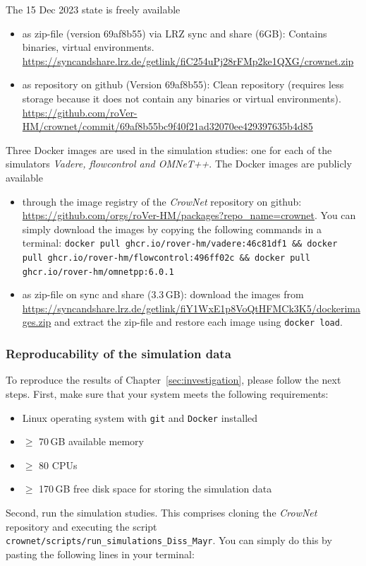 \newpage
The 15 Dec 2023 state is freely available
\begin{itemize}
\item  as zip-file (version 69af8b55) via LRZ sync and share (6GB): Contains binaries, virtual environments. \url{https://syncandshare.lrz.de/getlink/fiC254uPj28rFMp2ke1QXG/crownet.zip}
\item {as repository on github (Version 69af8b55)}: Clean repository (requires less storage because it does not contain any binaries or virtual environments). \url{https://github.com/roVer-HM/crownet/commit/69af8b55bc9f40f21ad32070ee429397635b4d85}
\end{itemize} 
Three Docker images are used in the simulation studies: one for each of the simulators \textit{Vadere, flowcontrol and OMNeT++}. The Docker images are publicly available
\begin{itemize}
\item through the image registry of the \textit{CrowNet} repository on github: \url{https://github.com/orgs/roVer-HM/packages?repo_name=crownet}. You can simply download the images by copying the following commands in a terminal:
\lstinline{docker pull ghcr.io/rover-hm/vadere:46c81df1 && docker pull ghcr.io/rover-hm/flowcontrol:496ff02c && docker pull ghcr.io/rover-hm/omnetpp:6.0.1}\textit{}
\item as zip-file on sync and share (3.3\,GB): download the images from  \url{https://syncandshare.lrz.de/getlink/fiY1WxE1p8VoQtHFMCk3K5/dockerimages.zip} and extract the zip-file and restore each image using \lstinline{docker load}. 
\end{itemize}


\subsubsection*{Reproducability of the simulation data}

To reproduce the results of Chapter~\ref{sec:investigation}, please follow the next steps.
First, make sure that your system meets the following requirements:
\begin{itemize}
\item Linux operating system with \lstinline{git} and \lstinline{Docker} installed
\item  $\geq$ 70\,GB available memory
\item  $\geq$ 80 CPUs
\item $\geq$ 170\,GB free disk space for storing the simulation data 
\end{itemize}
Second, run the simulation studies. This comprises cloning the \textit{CrowNet} repository and executing the script 
\lstinline{crownet/scripts/run_simulations_Diss_Mayr}. You can simply do this by pasting the following lines in your terminal:


